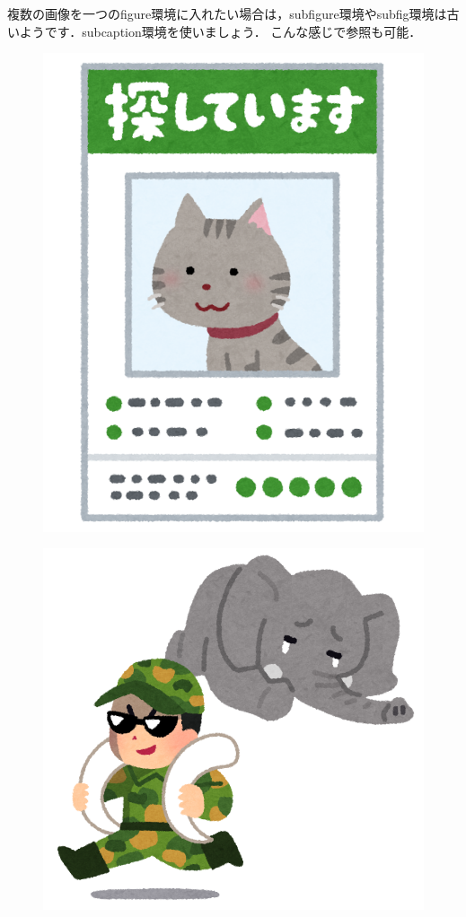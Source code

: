\documentclass[a4j]{jsarticle}
\numberwithin{equation}{section}%
\begin{document}
複数の画像を一つのfigure環境に入れたい場合は，subfigure環境やsubfig環境は古いようです．subcaption環境を使いましょう．
こんな感じで参照も可能．

\begin{figure}[tb]
  \begin{minipage}[b]{.5\columnwidth}
   \centering
   \includegraphics[width=\columnwidth]{./figure/cat.png}
   \label{fig:frog}
 \end{minipage}%
 \begin{minipage}[b]{.5\columnwidth}
  \centering
  \includegraphics[width=\columnwidth]{./figure/elephant.png}

\end{minipage}
\end{figure}
\end{document}
